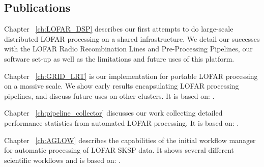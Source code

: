 \subsection{Publications}

Chapter ~\ref{ch:LOFAR_DSP} describes our first attempts to do large-scale distributed LOFAR processing on a shared infrastructure. We detail our successes with the LOFAR Radio Recombination Lines and Pre-Processing Pipelines, our software set-up as well as the limitations and future uses of this platform.  


Chapter ~\ref{ch:GRID_LRT} is our implementation for portable LOFAR processing on a massive scale. We show early results encapsulating LOFAR processing pipelines, and discuss future uses on other clusters. It is based on:  .

Chapter ~\ref{ch:pipeline_collector} discusses our work collecting detailed performance statistics from automated LOFAR processing. It is based on: .

Chapter ~\ref{ch:AGLOW} describes the capabilities of the initial workflow manager for automatic processing of LOFAR SKSP data. It shows several different scientific workflows and is based on: .

